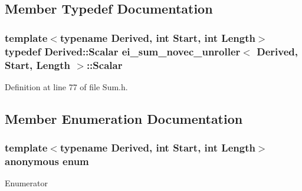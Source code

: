 \subsection{Member Typedef Documentation}
\hypertarget{structei__sum__novec__unroller_adfeab8771427bd1565101fb2b965b08e}{
\subsubsection[{Scalar}]{\setlength{\rightskip}{0pt plus 5cm}template$<$typename Derived, int Start, int Length$>$ typedef Derived\-::\-Scalar {\bf ei\-\_\-sum\-\_\-novec\-\_\-unroller}$<$ Derived, Start, Length $>$\-::{\bf Scalar}}}\label{structei__sum__novec__unroller_adfeab8771427bd1565101fb2b965b08e}


Definition at line 77 of file Sum.\-h.



\subsection{Member Enumeration Documentation}
\hypertarget{structei__sum__novec__unroller_adc17f4323785b577f80948d7cdc7c64a}{\subsubsection[{anonymous enum}]{\setlength{\rightskip}{0pt plus 5cm}template$<$typename Derived, int Start, int Length$>$ anonymous enum}}\label{structei__sum__novec__unroller_adc17f4323785b577f80948d7cdc7c64a}
\begin{Desc}
\item[Enumerator]\par
\begin{description}
\item[{\em 
\hypertarget{structei__sum__novec__unroller_adc17f4323785b577f80948d7cdc7c64aa86e290a0eed704f671cdd6f9955dabf3}{Half\-Length}\label{structei__sum__novec__unroller_adc17f4323785b577f80948d7cdc7c64aa86e290a0eed704f671cdd6f9955dabf3}
}]\end{description}
\end{Desc}


